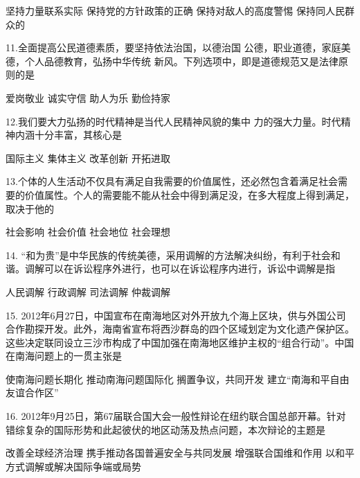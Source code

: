 \begin{choices}
	 坚持力量联系实际
	 保持党的方针政策的正确 
	 保持对敌人的高度警惕
	 保持同人民群众的
\end{choices}
11.全面提高公民道德素质，要坚持依法治国，以德治国 公德，职业道德，家庭美德，个人品德教育，弘扬中华传统 新风。下列选项中，即是道德规范又是法律原则的是
\begin{choices}
	 爱岗敬业
	 诚实守信
	 助人为乐
	 勤俭持家
\end{choices}
12.我们要大力弘扬的时代精神是当代人民精神风貌的集中 力的强大力量。时代精神内涵十分丰富，其核心是
\begin{choices}
	 国际主义
	 集体主义
	 改革创新
	 开拓进取
\end{choices}
13.个体的人生活动不仅具有满足自我需要的价值属性，还必然包含着满足社会需要的价值属性。个人的需要能不能从社会中得到满足没，在多大程度上得到满足，取决于他的
\begin{choices}
	 社会影响
	 社会价值
	 社会地位
	 社会理想
\end{choices}
14. “和为贵”是中华民族的传统美德，采用调解的方法解决纠纷，有利于社会和谐。调解可以在诉讼程序外进行，也可以在诉讼程序内进行，诉讼中调解是指
\begin{choices}
	 人民调解
	 行政调解
	 司法调解
	 仲裁调解
\end{choices}
15. 2012年6月27日，中国宣布在南海地区对外开放九个海上区块，供与外国公司合作勘探开发。此外，海南省宣布将西沙群岛的四个区域划定为文化遗产保护区。这些决定联同设立三沙市构成了中国加强在南海地区维护主权的“组合行动”。中国在南海问题上的一贯主张是
\begin{choices}
	 使南海问题长期化
	 推动南海问题国际化
	 搁置争议，共同开发
	 建立“南海和平自由友谊合作区”
\end{choices}
16. 2012年9月25日，第67届联合国大会一般性辩论在纽约联合国总部开幕。针对错综复杂的国际形势和此起彼伏的地区动荡及热点问题，本次辩论的主题是
\begin{choices}
	 改善全球经济治理
	 携手推动各国普遍安全与共同发展
	 增强联合国维和作用
	 以和平方式调解或解决国际争端或局势
\end{choices}
\vspace{6pt}
